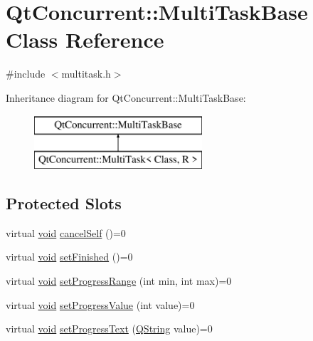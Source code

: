 \hypertarget{class_qt_concurrent_1_1_multi_task_base}{\section{\-Qt\-Concurrent\-:\-:\-Multi\-Task\-Base \-Class \-Reference}
\label{class_qt_concurrent_1_1_multi_task_base}
}


{\ttfamily \#include $<$multitask.\-h$>$}

\-Inheritance diagram for \-Qt\-Concurrent\-:\-:\-Multi\-Task\-Base\-:\begin{figure}[H]
\begin{center}
\leavevmode
\includegraphics[height=2.000000cm]{class_qt_concurrent_1_1_multi_task_base}
\end{center}
\end{figure}
\subsection*{\-Protected \-Slots}
\begin{DoxyCompactItemize}
\item 
virtual \hyperlink{group___u_a_v_objects_plugin_ga444cf2ff3f0ecbe028adce838d373f5c}{void} \hyperlink{class_qt_concurrent_1_1_multi_task_base_a7a36b152012c4c8f1fdf9adedfc52872}{cancel\-Self} ()=0
\item 
virtual \hyperlink{group___u_a_v_objects_plugin_ga444cf2ff3f0ecbe028adce838d373f5c}{void} \hyperlink{class_qt_concurrent_1_1_multi_task_base_aa65148b44f23c1384db813a88ed13285}{set\-Finished} ()=0
\item 
virtual \hyperlink{group___u_a_v_objects_plugin_ga444cf2ff3f0ecbe028adce838d373f5c}{void} \hyperlink{class_qt_concurrent_1_1_multi_task_base_a3b5d534dc71c07fe833fdd7b0ad2fd90}{set\-Progress\-Range} (int min, int max)=0
\item 
virtual \hyperlink{group___u_a_v_objects_plugin_ga444cf2ff3f0ecbe028adce838d373f5c}{void} \hyperlink{class_qt_concurrent_1_1_multi_task_base_a8166aa2335d6adaba9e2895e23468a69}{set\-Progress\-Value} (int value)=0
\item 
virtual \hyperlink{group___u_a_v_objects_plugin_ga444cf2ff3f0ecbe028adce838d373f5c}{void} \hyperlink{class_qt_concurrent_1_1_multi_task_base_a84581e7863640d10845ab80da959d024}{set\-Progress\-Text} (\hyperlink{group___u_a_v_objects_plugin_gab9d252f49c333c94a72f97ce3105a32d}{\-Q\-String} value)=0
\end{DoxyCompactItemize}


